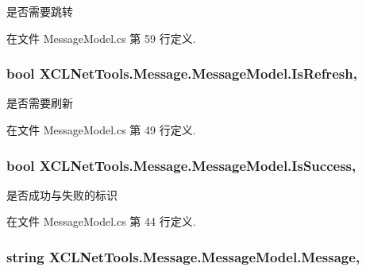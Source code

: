 是否需要跳转 



在文件 Message\-Model.\-cs 第 59 行定义.

\hypertarget{class_x_c_l_net_tools_1_1_message_1_1_message_model_a9bdd2a6fd62936962fe1a06233809f02}{
\subsubsection[{Is\-Refresh}]{\setlength{\rightskip}{0pt plus 5cm}bool X\-C\-L\-Net\-Tools.\-Message.\-Message\-Model.\-Is\-Refresh\hspace{0.3cm}{\ttfamily [get]}, {\ttfamily [set]}}}\label{class_x_c_l_net_tools_1_1_message_1_1_message_model_a9bdd2a6fd62936962fe1a06233809f02}


是否需要刷新 



在文件 Message\-Model.\-cs 第 49 行定义.

\hypertarget{class_x_c_l_net_tools_1_1_message_1_1_message_model_a05485b542b8ef7f795ed5618fb80da03}{
\subsubsection[{Is\-Success}]{\setlength{\rightskip}{0pt plus 5cm}bool X\-C\-L\-Net\-Tools.\-Message.\-Message\-Model.\-Is\-Success\hspace{0.3cm}{\ttfamily [get]}, {\ttfamily [set]}}}\label{class_x_c_l_net_tools_1_1_message_1_1_message_model_a05485b542b8ef7f795ed5618fb80da03}


是否成功与失败的标识 



在文件 Message\-Model.\-cs 第 44 行定义.

\hypertarget{class_x_c_l_net_tools_1_1_message_1_1_message_model_a2c6df6335e3adab4b188833ce8fec192}{
\subsubsection[{Message}]{\setlength{\rightskip}{0pt plus 5cm}string X\-C\-L\-Net\-Tools.\-Message.\-Message\-Model.\-Message\hspace{0.3cm}{\ttfamily [get]}, {\ttfamily [set]}}}\label{class_x_c_l_net_tools_1_1_message_1_1_message_model_a2c6df6335e3adab4b188833ce8fec192}


